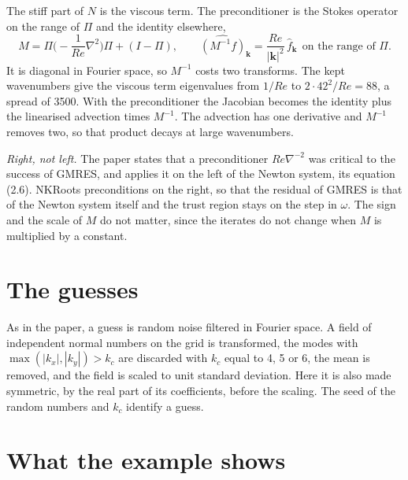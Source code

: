 \documentclass[11pt,a4paper]{article}
\newcommand{\Rey}{\mathit{Re}}
\newcommand{\om}{\omega}
\begin{document}
The stiff part of $N$ is the viscous term. The preconditioner is the Stokes operator on the range of $\Pi$ and the identity elsewhere,
\begin{equation}
M = \Pi\Big(-\frac{1}{\Rey}\nabla^2\Big)\Pi + (I - \Pi), \qquad
\widehat{(M^{-1}f)}_{\mathbf k} = \frac{\Rey}{|\mathbf k|^2}\,\hat f_{\mathbf k}\ \ \text{on the range of }\Pi .
\end{equation}
It is diagonal in Fourier space, so $M^{-1}$ costs two transforms. The kept wavenumbers give the viscous term eigenvalues from $1/\Rey$ to $2\cdot42^2/\Rey = 88$, a spread of 3500. With the preconditioner the Jacobian becomes the identity plus the linearised advection times $M^{-1}$. The advection has one derivative and $M^{-1}$ removes two, so that product decays at large wavenumbers.

\emph{Right, not left.} The paper states that a preconditioner $\Rey\nabla^{-2}$ was critical to the success of GMRES, and applies it on the left of the Newton system, its equation (2.6). NKRoots preconditions on the right, so that the residual of GMRES is that of the Newton system itself and the trust region stays on the step in $\om$. The sign and the scale of $M$ do not matter, since the iterates do not change when $M$ is multiplied by a constant.

\section{The guesses}

As in the paper, a guess is random noise filtered in Fourier space. A field of independent normal numbers on the grid is transformed, the modes with $\max(|k_x|, |k_y|) > k_c$ are discarded with $k_c$ equal to 4, 5 or 6, the mean is removed, and the field is scaled to unit standard deviation. Here it is also made symmetric, by the real part of its coefficients, before the scaling. The seed of the random numbers and $k_c$ identify a guess.

\section{What the example shows}
\end{document}
